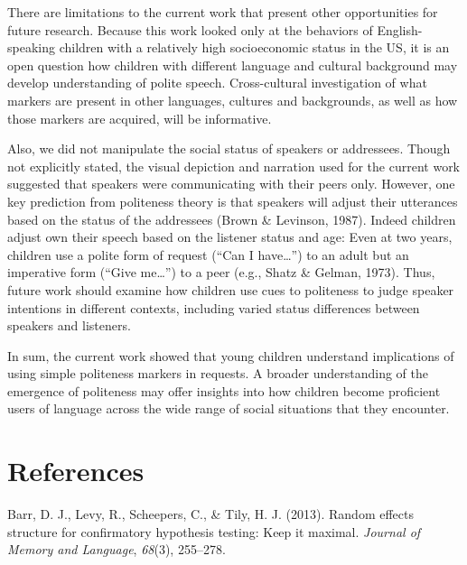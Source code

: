 \documentclass[10pt, letterpaper]{article}
\begin{document}
There are limitations to the current work that present other
opportunities for future research. Because this work looked only at the
behaviors of English-speaking children with a relatively high
socioeconomic status in the US, it is an open question how children with
different language and cultural background may develop understanding of
polite speech. Cross-cultural investigation of what markers are present
in other languages, cultures and backgrounds, as well as how those
markers are acquired, will be informative.

Also, we did not manipulate the social status of speakers or addressees.
Though not explicitly stated, the visual depiction and narration used
for the current work suggested that speakers were communicating with
their peers only. However, one key prediction from politeness theory is
that speakers will adjust their utterances based on the status of the
addressees (Brown \& Levinson, 1987). Indeed children adjust own their
speech based on the listener status and age: Even at two years, children
use a polite form of request (``Can I have\ldots{}'') to an adult but an
imperative form (``Give me\ldots{}'') to a peer (e.g., Shatz \& Gelman,
1973). Thus, future work should examine how children use cues to
politeness to judge speaker intentions in different contexts, including
varied status differences between speakers and listeners.

In sum, the current work showed that young children understand
implications of using simple politeness markers in requests. A broader
understanding of the emergence of politeness may offer insights into how
children become proficient users of language across the wide range of
social situations that they encounter.

\vspace{1em}
\vspace{1em} \noindent

\section{References}\label{references}

\setlength{\parindent}{-0.1in} \setlength{\leftskip}{0.125in} \noindent

\hypertarget{refs}{}
\hypertarget{ref-barr2013}{}
Barr, D. J., Levy, R., Scheepers, C., \& Tily, H. J. (2013). Random
effects structure for confirmatory hypothesis testing: Keep it maximal.
\emph{Journal of Memory and Language}, \emph{68}(3), 255--278.
\end{document}
